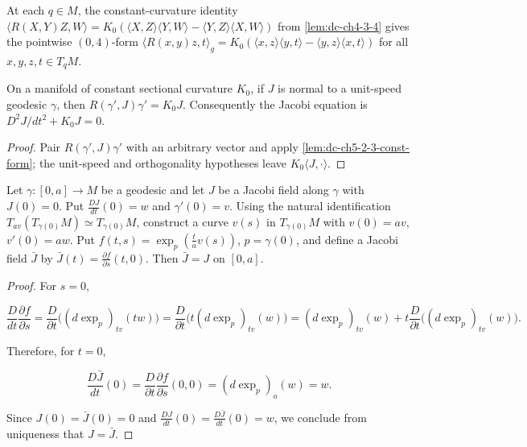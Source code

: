 \begin{lemma}
  \label{lem:dc-ch5-2-3-const-form}
  \leanok
  At each $q\in M$, the constant-curvature identity
  $\langle R(X,Y)Z,W\rangle=K_0(\langle X,Z\rangle\langle Y,W\rangle-\langle Y,Z\rangle\langle X,W\rangle)$
  from \cref{lem:dc-ch4-3-4} gives the pointwise $(0,4)$-form
  $\langle R(x,y)z,t\rangle_g=K_0(\langle x,z\rangle\langle y,t\rangle-\langle y,z\rangle\langle x,t\rangle)$
  for all $x,y,z,t\in T_qM$.
\end{lemma}

\begin{lemma}[constant curvature: $R(\gamma',J)\gamma'=K J$, coordinate form]
  \label{lem:dc-ch5-2-3-jacobi-op}
  \leanok
  On a manifold of constant sectional curvature $K_0$, if $J$ is normal to a
  unit-speed geodesic $\gamma$, then
  $R(\gamma',J)\gamma'=K_0J$. Consequently the Jacobi equation is
  $D^2J/dt^2+K_0J=0$.
\end{lemma}
\begin{proof}

  \sketch
  Pair $R(\gamma',J)\gamma'$ with an arbitrary vector and apply
  \cref{lem:dc-ch5-2-3-const-form}; the unit-speed and orthogonality hypotheses
  leave $K_0\langle J,\cdot\rangle$.
\end{proof}

\begin{proposition}
  \label{prop:dc-ch5-2-4}
  \leanok
  Let $\gamma:[0,a]\to M$ be a geodesic and let $J$ be a Jacobi field along
  $\gamma$ with $J(0)=0$. Put $\frac{DJ}{dt}(0)=w$ and $\gamma'(0)=v$. Using the
  natural identification $T_{av}(T_{\gamma(0)}M)\simeq T_{\gamma(0)}M$, construct a
  curve $v(s)$ in $T_{\gamma(0)}M$ with $v(0)=av$, $v'(0)=aw$. Put
  $f(t,s)=\exp_p(\frac{t}{a}v(s))$,
  $p=\gamma(0)$, and define a Jacobi field $\bar J$ by
  $\bar J(t)=\frac{\partial f}{\partial s}(t,0)$. Then $\bar J=J$ on $[0,a]$.
\end{proposition}
\begin{proof}
  \leanok
  \sketch
  For $s=0$,
  
  $$
  \frac{D}{dt}\frac{\partial f}{\partial s}=\frac{D}{\partial t}\big((d\exp_p)_{tv}(tw)\big)
  =\frac{D}{\partial t}\big(t(d\exp_p)_{tv}(w)\big)
  =(d\exp_p)_{tv}(w)+t\frac{D}{\partial t}\big((d\exp_p)_{tv}(w)\big).
  $$
  
  Therefore, for $t=0$,
  
  $$
  \frac{D\bar J}{dt}(0)=\frac{D}{\partial t}\frac{\partial f}{\partial s}(0,0)=(d\exp_p)_o(w)=w.
  $$
  
  Since $J(0)=\bar J(0)=0$ and $\frac{DJ}{dt}(0)=\frac{D\bar J}{dt}(0)=w$, we
  conclude from uniqueness that $J=\bar J$.
\end{proof}

